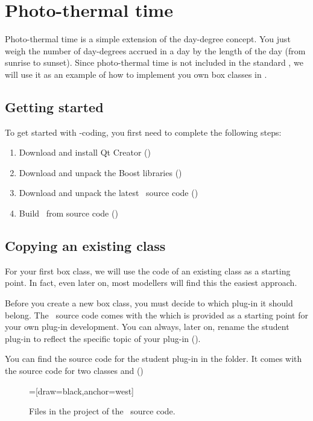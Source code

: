 \section {Photo-thermal time}
Photo-thermal time is a simple extension of the day-degree concept. You just weigh the  number of day-degrees accrued in a day by the length of the day (from sunrise to sunset). Since photo-thermal time is not included in the standard \US, we will use it as an example of how to implement you own box classes in \US.

\subsection {Getting started}
To get started with \CPP-coding, you first need to complete the following steps:
\begin{enumerate}
\item Download and install Qt Creator ()
\item Download and unpack the Boost libraries ()
\item Download and unpack the latest \US\ source code ()
\item Build \US\ from source code ()
\end{enumerate}

\subsection {Copying an existing class}
For your first box class, we will use the code of an existing class as a starting point. In fact, even later on, most modellers will find this the easiest approach.

Before you create a new box class, you must decide to which plug-in it should belong. The \US\ source code comes with the  which is provided as a starting point for your own plug-in development. You can always, later on, rename the student plug-in to reflect the specific topic of your plug-in ().

You can find the source code for the student plug-in in the  folder. It comes with the source code for two classes  and  ()

\begin {figure} [ht]
\centering
{}=[draw=black,anchor=west]
\caption{Files in the  project of the \US\ source code.}
\label{qt-creator-student-files-1}
\end{figure}

